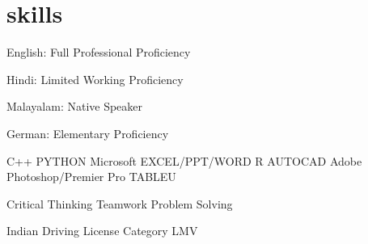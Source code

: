 \documentclass[]{deedy-resume-openfont}
\begin{document}
\section{skills}
\location{}
\begin{tightemize}
\item English: Full Professional Proficiency 
\item Hindi: Limited Working Proficiency 
\item Malayalam: Native Speaker
\item German: Elementary Proficiency 
\end{tightemize}
\sectionsep


\location{}
C++ \textbullet{}   PYTHON \textbullet{}  Microsoft EXCEL/PPT/WORD \textbullet{} R \textbullet{} AUTOCAD \textbullet{} Adobe Photoshop/Premier Pro \textbullet{} TABLEU 
\sectionsep

\location{}
Critical Thinking \textbullet{} Teamwork \textbullet{} Problem Solving
\sectionsep

\location{}
\begin{tightemize}
\item Indian Driving License Category LMV 
\end{tightemize}
\sectionsep
\end{document}
